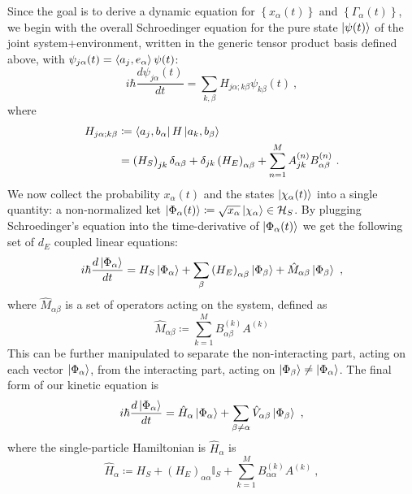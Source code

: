 \documentclass[draft,nofootinbib,pre,twocolumn,showpacs,showkeys,preprintnumbers,floatfix]{revtex4-1}
\newcommand{\1}{\mathbbm{1}}
\begin{document}
Since the goal is to derive a dynamic equation for $\left\{x_\alpha(t) \right\}$ and $\left\{\Gamma_\alpha(t)\right\}$,
we begin with the overall Schroedinger equation for the pure state $\ket{\psi(t)}$ of the joint system+environment, written
in the generic tensor product basis defined above, with $\psi_{j\alpha}(t) = \braket{a_j,e_\alpha}{\psi(t)}$:
\begin{equation}
i\hbar \frac{d \psi_{j\alpha}(t)}{dt} = \sum_{k,\beta} H_{j\alpha;k\beta} \psi_{k\beta}(t)~,
\end{equation}
where
\begin{align}
H_{j\alpha;k\beta} &\coloneqq \bra{a_j,b_\alpha} H \ket{a_k,b_\beta}\\
&= \left(H_S\right)_{jk}\delta_{\alpha \beta} + \delta_{jk} \left(H_E\right)_{\alpha \beta} + \sum_{n=1}^M A_{jk}^{(n)} B^{(n)}_{\alpha \beta}~.\nonumber 
\end{align}
We now collect the probability $x_\alpha(t)$ and the states $\ket{\chi_\alpha(t)}$ into
a single quantity: a non-normalized ket $\ket{\Phi_\alpha(t)} \coloneqq \sqrt{x_\alpha}\ket{\chi_\alpha} \in \mathcal{H}_S$.
By plugging Schroedinger's equation into the time-derivative of $\ket{\Phi_\alpha(t)}$ we get the following set of $d_E$
coupled linear equations:
\begin{equation}
i\hbar \frac{d \ket{\Phi_\alpha}}{dt} = H_S \ket{\Phi_\alpha} + \sum_{\beta} \left( H_E\right)_{\alpha\beta}\ket{\Phi_\beta} + \hat{M}_{\alpha \beta}\ket{\Phi_\beta}~,
\end{equation}
where $\hat{M}_{\alpha\beta}$ is a set of operators acting on the system, defined as 
\begin{equation}
\hat{M}_{\alpha \beta} \coloneqq \sum_{k=1}^M B^{(k)}_{\alpha\beta} A^{(k)}
\end{equation}
This can be further manipulated to separate the non-interacting part, acting on each vector $\ket{\Phi_\alpha}$, 
from the interacting part, acting on $\ket{\Phi_\beta}\neq \ket{\Phi_\alpha}$. The final form of our kinetic equation is
\begin{equation}
i\hbar \frac{d \ket{\Phi_\alpha}}{dt} = \hat{H}_\alpha \ket{\Phi_\alpha} + \sum_{\beta \neq \alpha} \hat{V}_{\alpha \beta}\ket{\Phi_\beta}~,\label{eq:kinetic}
\end{equation}
where the single-particle Hamiltonian is $\hat{H}_\alpha$ is
\begin{equation}
\hat{H}_\alpha \coloneqq H_S + \left( H_E\right)_{\alpha \alpha} \mathbb{I}_S + \sum_{k=1}^M B^{(k)}_{\alpha \alpha}A^{(k)}~,\label{ed:def_Halpha}
\end{equation}
\end{document}
